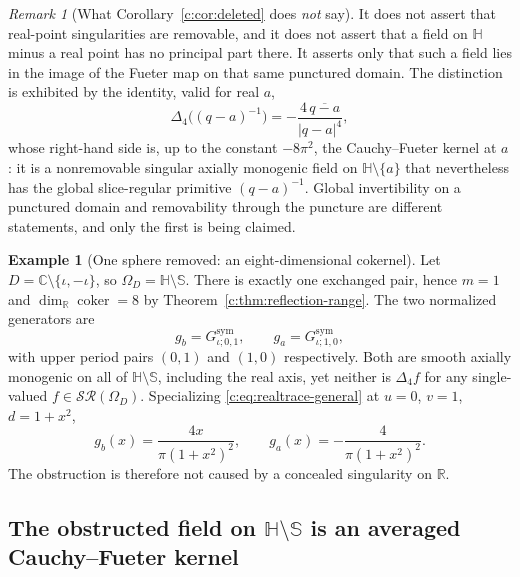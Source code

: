 \documentclass[11pt,a4paper]{article}
\numberwithin{equation}{section}
\theoremstyle{definition}
\newtheorem{example}[theorem]{Example}
\theoremstyle{remark}
\newtheorem{remark}[theorem]{Remark}
\theoremstyle{plain}
\newcommand{\HH}{\mathbb H}
\newcommand{\RR}{\mathbb R}
\newcommand{\CC}{\mathbb C}
\newcommand{\SSS}{\mathbb S}
\newcommand{\lap}{\Delta_4}
\newcommand{\SR}{\mathcal{SR}}
\newcommand{\Om}{\Omega}
\newcommand{\abs}[1]{\lvert #1\rvert}
\begin{document}
\begin{remark}[What Corollary~\ref{c:cor:deleted} does \emph{not} say]
It does not assert that real-point singularities are removable, and it
does not assert that a field on $\HH$ minus a real point has no principal
part there.  It asserts only that such a field lies in the image of the
Fueter map on that same punctured domain.  The distinction is exhibited
by the identity, valid for real $a$,
\begin{equation}
  \lap\bigl((q-a)^{-1}\bigr)
   =-\frac{4\,\overline{q-a}}{\abs{q-a}^{4}},
  \label{c:eq:realkernel}
\end{equation}
whose right-hand side is, up to the constant $-8\pi^2$, the
Cauchy--Fueter kernel at $a$: it is a nonremovable singular axially
monogenic field on $\HH\setminus\{a\}$ that nevertheless has the global
slice-regular primitive $(q-a)^{-1}$.  Global invertibility on a
punctured domain and removability through the puncture are different
statements, and only the first is being claimed.
\end{remark}

\begin{example}[One sphere removed: an eight-dimensional cokernel]
\label{c:ex:sphere}
Let $D=\CC\setminus\{\iota,-\iota\}$, so $\Om_D=\HH\setminus\SSS$.
There is exactly one exchanged pair, hence $m=1$ and
$\dim_\RR\operatorname{coker}=8$ by
Theorem~\ref{c:thm:reflection-range}.  The two normalized generators are
\[
  g_b=G^{\mathrm{sym}}_{\iota;0,1},\qquad
  g_a=G^{\mathrm{sym}}_{\iota;1,0},
\]
with upper period pairs $(0,1)$ and $(1,0)$ respectively.  Both are
smooth axially monogenic on all of $\HH\setminus\SSS$, including the real
axis, yet neither is $\lap f$ for any single-valued $f\in\SR(\Om_D)$.
Specializing \eqref{c:eq:realtrace-general} at $u=0$, $v=1$, $d=1+x^2$,
\begin{equation}
  g_b(x)=\frac{4x}{\pi(1+x^{2})^{2}},
  \qquad
  g_a(x)=-\frac{4}{\pi(1+x^{2})^{2}} .
  \label{c:eq:realtraces}
\end{equation}
The obstruction is therefore not caused by a concealed singularity on
$\RR$.
\end{example}

\subsection{The obstructed field on \texorpdfstring{$\HH\setminus\SSS$}{H minus S} is an averaged Cauchy--Fueter kernel}
\end{document}
